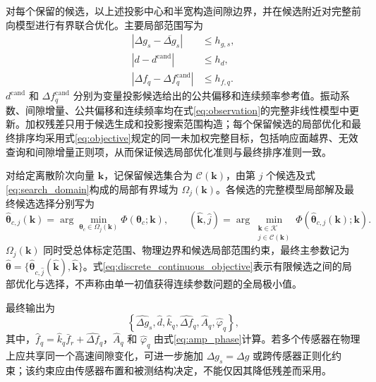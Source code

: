 \documentclass[UTF8,12pt,a4paper]{ctexart}
\begin{document}
对每个保留的候选，以上述投影中心和半宽构造间隙边界，并在候选附近对完整前向模型进行有界联合优化。主要局部范围写为
\begin{equation}
\begin{aligned}
|\Delta g_s-\overline{\Delta g}_s|&\leq h_{g,s},\\
|d-d^{\mathrm{cand}}|&\leq h_d,\\
|\Delta f_q-\Delta f_q^{\mathrm{cand}}|&\leq h_{f,q}.
\end{aligned}
\label{eq:search_domain}
\end{equation}
$d^{\mathrm{cand}}$ 和 $\Delta f_q^{\mathrm{cand}}$ 分别为变量投影候选给出的公共偏移和连续频率参考值。振动系数、间隙增量、公共偏移和连续频率均在式\eqref{eq:observation}的完整非线性模型中更新。加权残差只用于候选生成和投影搜索范围构造；每个保留候选的局部优化和最终排序均采用式\eqref{eq:objective}规定的同一未加权完整目标，包括响应面越界、无效查询和间隙增量正则项，从而保证候选局部优化准则与最终排序准则一致。

对给定离散阶次向量 $\bm k$，记保留候选集合为 $\mathcal C(\bm k)$，由第 $j$ 个候选及式\eqref{eq:search_domain}构成的局部有界域为 $\Omega_j(\bm k)$。各候选的完整模型局部解及最终候选选择分别写为
\begin{equation}
\widehat{\bm\theta}_{c,j}(\bm k)
=\arg\min_{\bm\theta_c\in\Omega_j(\bm k)}
\Phi(\bm\theta_c;\bm k),
\qquad
(\widehat{\bm k},\widehat j)
=\arg\min_{\substack{\bm k\in\mathcal K\\j\in\mathcal C(\bm k)}}
\Phi\!\left(\widehat{\bm\theta}_{c,j}(\bm k);\bm k\right).
\label{eq:discrete_continuous_objective}
\end{equation}
$\Omega_j(\bm k)$ 同时受总体标定范围、物理边界和候选局部范围约束，最终主参数记为 $\widehat{\bm\theta}=\{\widehat{\bm\theta}_{c,\widehat j}(\widehat{\bm k}),\widehat{\bm k}\}$。式\eqref{eq:discrete_continuous_objective}表示有限候选之间的局部优化与选择，不声称由单一初值获得连续参数问题的全局极小值。

最终输出为
\begin{equation}
\left\{
\widehat{\Delta g}_s,
\widehat d,
\widehat k_q,
\widehat{\Delta f}_q,
\widehat A_q,
\widehat\varphi_q
\right\},
\label{eq:outputs}
\end{equation}
其中，$\widehat f_q=\widehat k_q\bar f_r+\widehat{\Delta f}_q$，$\widehat A_q$ 和 $\widehat\varphi_q$ 由式\eqref{eq:amp_phase}计算。若多个传感器在物理上应共享同一个高速间隙变化，可进一步施加 $\Delta g_s=\Delta g$ 或跨传感器正则化约束；该约束应由传感器布置和被测结构决定，不能仅因其降低残差而采用。
\end{document}
